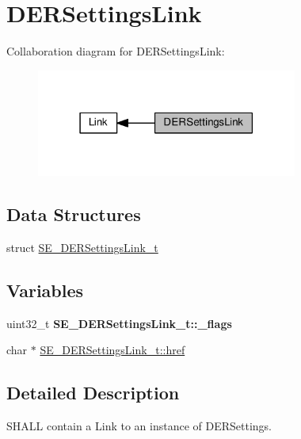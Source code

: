 \hypertarget{group__DERSettingsLink}{}\section{D\+E\+R\+Settings\+Link}
\label{group__DERSettingsLink}
Collaboration diagram for D\+E\+R\+Settings\+Link\+:\nopagebreak
\begin{figure}[H]
\begin{center}
\leavevmode
\includegraphics[width=243pt]{group__DERSettingsLink}
\end{center}
\end{figure}
\subsection*{Data Structures}
\begin{DoxyCompactItemize}
\item 
struct \hyperlink{structSE__DERSettingsLink__t}{S\+E\+\_\+\+D\+E\+R\+Settings\+Link\+\_\+t}
\end{DoxyCompactItemize}
\subsection*{Variables}
\begin{DoxyCompactItemize}
\item 
\mbox{\label{group__DERSettingsLink_gad8ccca9f061858a81cd461d07149170d}} 
uint32\+\_\+t {\bfseries S\+E\+\_\+\+D\+E\+R\+Settings\+Link\+\_\+t\+::\+\_\+flags}
\item 
char $\ast$ \hyperlink{group__DERSettingsLink_gac10ce9888bd10f208a2968aba046bef5}{S\+E\+\_\+\+D\+E\+R\+Settings\+Link\+\_\+t\+::href}
\end{DoxyCompactItemize}


\subsection{Detailed Description}
S\+H\+A\+LL contain a Link to an instance of D\+E\+R\+Settings. 


